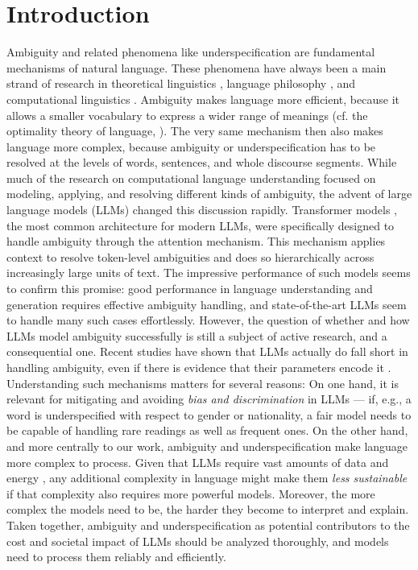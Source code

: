 \documentclass[final]{clv2025}
\begin{document}
\section{Introduction}
Ambiguity and related phenomena like underspecification are fundamental mechanisms of natural language. These phenomena have always been a main strand of research in theoretical linguistics \cite{Pinkal:1996_4}, language philosophy \cite{792f2d10-c65a-376e-b38a-492fd422a07d}, and computational linguistics \cite{hobbs-shieber-1987-algorithm,10.1093/jos/10.2.123}. Ambiguity makes language more efficient, because it allows a smaller vocabulary to express a wider range of meanings (cf. the optimality theory of language, \cite{PIANTADOSI2012280}). The very same mechanism then also makes language more complex, because ambiguity or underspecification has to be resolved at the levels of words, sentences, and whole discourse segments.
While much of the research on computational language understanding focused on modeling, applying, and resolving different kinds of ambiguity, the advent of large language models (LLMs) changed this discussion rapidly. Transformer models \cite{NIPS2017_3f5ee243}, the most common architecture for modern LLMs, were specifically designed to handle ambiguity through the attention mechanism. This mechanism applies context to resolve token-level ambiguities and does so hierarchically across increasingly large units of text. The impressive performance of such models seems to confirm this promise: good performance in language understanding and generation requires effective ambiguity handling, and state-of-the-art LLMs seem to handle many such cases effortlessly.
However, the question of whether and how LLMs model ambiguity successfully is still a subject of active research, and a consequential one. Recent studies \cite{liu-etal-2023-afraid,gehring-roth-2025-ambistory} have shown that LLMs actually do fall short in handling ambiguity, even if there is evidence that their parameters encode it \cite{karamolegkou-etal-2025-trick}. Understanding such mechanisms matters for several reasons: On one hand, it is relevant for mitigating and avoiding \emph{bias and discrimination} in LLMs — if, e.g., a word is underspecified with respect to gender or nationality, a fair model needs to be capable of handling rare readings as well as frequent ones. On the other hand, and more centrally to our work, ambiguity and underspecification make language more complex to process. Given that LLMs require vast amounts of data and energy \cite{strubell-etal-2019-energy}, any additional complexity in language might make them \emph{less sustainable} if that complexity also requires more powerful models. Moreover, the more complex the models need to be, the harder they become to interpret and explain. Taken together, ambiguity and underspecification as potential contributors to the cost and societal impact of LLMs should be analyzed thoroughly, and models need to process them reliably and efficiently.
\end{document}
